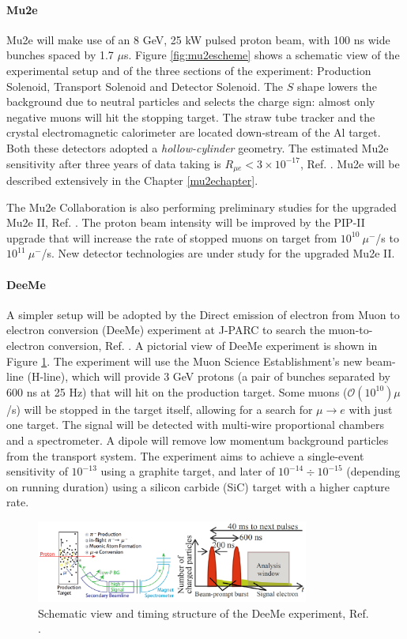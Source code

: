 \paragraph{Mu2e}
Mu2e will make use of an 8 GeV, 
25 kW pulsed proton beam, with 100 
ns wide bunches spaced by 1.7 $\mu$s. 
Figure \ref{fig:mu2escheme} shows a 
schematic view of the experimental setup and of the
three sections of the experiment: 
Production Solenoid, Transport
Solenoid and Detector Solenoid. The 
$S$ shape lowers the background due to 
neutral particles and selects the 
charge sign: almost only negative 
muons will hit the stopping target. 
The straw tube tracker and the crystal 
electromagnetic calorimeter are located 
down-stream of the Al target. 
Both these detectors adopted a 
\textit{hollow-cylinder} geometry. 
The estimated Mu2e sensitivity after 
three years of data taking is 
$R_{\mu e} < 3 \times 10^{-17}$, 
Ref. \cite{universe9010054}.
Mu2e will be described 
extensively in the Chapter \ref{mu2echapter}.

The Mu2e Collaboration is also 
performing preliminary studies for 
the upgraded Mu2e II, Ref. \cite{dukes}. 
The proton beam intensity will be 
improved by the PIP-II upgrade that 
will increase the rate of stopped muons 
on target from $10^{10} \ \mu^-$/s 
to $10^{11} \ \mu^-$/s. New detector 
technologies are under study for the upgraded
Mu2e II.
\paragraph{DeeMe}
A simpler setup will be adopted 
by the Direct emission of electron 
from Muon to electron conversion (DeeMe) 
experiment at J-PARC to search 
the muon-to-electron conversion, Ref. \cite{deeme}.
A pictorial view of DeeMe experiment is shown in Figure 
\ref{fig:deeme}.
The experiment will use the Muon 
Science Establishment's new beam-line (H-line), 
which will provide 3 GeV protons 
(a pair of bunches separated by 600 ns at 25 Hz) 
that will hit on the production target. 
Some muons ($\mathcal{O}(10^{10})\mu$/s) 
will be stopped in the target itself, 
allowing for a search for $\mu \rightarrow e$ 
with just one target. The signal will be detected 
with multi-wire proportional chambers and a 
spectrometer. 
A dipole will remove low momentum background 
particles from the transport system. 
The experiment aims to achieve a single-event 
sensitivity of $10^{-13}$ using a graphite target, 
and later of $10^{-14} \div 10^{-15}$ 
(depending on running duration) using a 
silicon carbide (SiC) target with a higher 
capture rate. 
\begin{figure}[!h]
    \centering
    \includegraphics[width =0.8\textwidth]{figures/png/Screenshot_20240322_101840.png}
    \caption[DeeMe experiment.]{Schematic view 
    and timing structure of the DeeMe experiment, Ref. \cite{deeme}.}
    \label{fig:deeme}
\end{figure}
